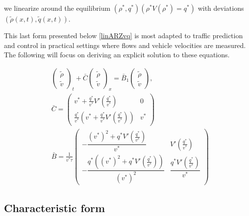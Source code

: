 \documentclass[a4paper, 10pt, conference]{ieeeconf}      %
\begin{document}
we linearize around the equilibrium {\footnotesize$(\rho^*, q^*)(\rho^*V(\rho^*) = q^*)$} with deviations {\footnotesize$(\tilde{\rho}(x,t), \tilde{q}(x,t))$}.

This last form presented below \eqref{linARZvq} is most adapted to traffic prediction and control in practical settings where flows and vehicle velocities are measured. The following will focus on deriving an explicit solution to these equations.

{\footnotesize
\begin{subequations} \label{linARZvq}
\begin{align}
&\begin{pmatrix}
	\tilde{\rho} \\
	\tilde{v}
\end{pmatrix}_t
+ \bar{C}
\begin{pmatrix}
	\tilde{\rho} \\ 
	\tilde{v}
\end{pmatrix}_x 
= 
\bar{B}_1
\begin{pmatrix}
	\tilde{\rho} \\
	\tilde{v}
\end{pmatrix}, \\
&\bar{C} 
=
\begin{pmatrix}
	v^* + \frac{q^*}{v^*} V'\left(\frac{q^*}{v^*}\right) & 0 \\
	\frac{q^*}{v^*} \left( v^* + \frac{q^*}{v^*} V'\left(\frac{q^*}{v^*}\right)\right) & v^*
\end{pmatrix} \\
&\bar{B} 
=
\frac{1}{v^{*}\tau}
\begin{pmatrix}
		-\dfrac{(v^*)^2+q^*V'\left(\frac{q^*}{v^*}\right)}{v^*} & V'\left(\frac{q^*}{v^*}\right) \\
		-\dfrac{q^*\left((v^*)^2 + q^*V'\left(\frac{q^*}{v^*}\right)\right)}{(v^*)^2}  & \dfrac{q^*V'\left(\frac{q^*}{v^*}\right)}{v^*}
\end{pmatrix}
\end{align}
\end{subequations}
}


\subsection{Characteristic form}
\end{document}
